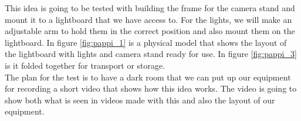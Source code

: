 \documentclass[a4paper]{jpconf}
\begin{document}









This idea is going to be tested with building the frame for the camera stand and mount it to a lightboard that we have access to.
For the lights, we will make an adjustable arm to hold them in the correct position and also mount them on the lightboard.
In figure \ref{fig:pappi_1} is a physical model that shows the layout of the lightboard with lights and camera stand ready for use.
In figure \ref{fig:pappi_3} is it folded together for transport or storage.\\
The plan for the test is to have a dark room that we can put up our equipment for recording a short video that shows how this idea works.
The video is going to show both what is seen in videos made with this and also the layout of our equipment.
\end{document}
